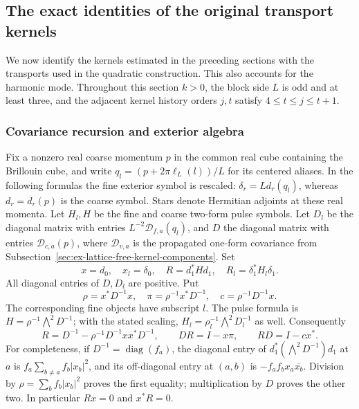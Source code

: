 \subsection{The exact identities of the original transport kernels}
\label{sec:kernel-transport-identities}
We now identify the kernels estimated in the preceding sections with
the transports used in the quadratic construction. This also accounts
for the harmonic mode. Throughout this section $k>0$, the block side
$L$ is odd and at least three, and the adjacent kernel history orders $j,t$
satisfy $4\le t\le j\le t+1$.

\subsubsection{Covariance recursion and exterior algebra}
Fix a nonzero real coarse momentum $p$ in the common real cube
containing the Brillouin cube, and write $q_l=(p+2\pi\ell_L(l))/L$
for its centered aliases. In the following formulas the fine exterior
symbol is rescaled: $\delta_r=Ld_r(q_l)$, whereas $d_r=d_r(p)$
is the coarse symbol. Stars denote Hermitian adjoints at these real
momenta. Let $H_l,H$ be the fine and coarse two-form pulse symbols.
Let $D_l$ be the diagonal matrix with entries $L^{-2}\mathscr D_{f,a}(q_l)$,
and $D$ the diagonal matrix with entries $\mathscr D_{c,a}(p)$, where
$\mathscr D_{v,a}$ is the propagated one-form covariance from
Subsection~\ref{sec:ex-lattice-free-kernel-components}.
Set
\[
 x=d_0,\quad x_l=\delta_0,\quad
 R=d_1^*Hd_1,\quad R_l=\delta_1^*H_l\delta_1.
\]
All diagonal entries of $D,D_l$ are positive. Put
\[
 \rho=x^*D^{-1}x,\quad
 \pi=\rho^{-1}x^*D^{-1},\quad
 c=\rho^{-1}D^{-1}x.
\]
The corresponding fine objects have subscript $l$. The pulse formula
is $H=\rho^{-1}\bigwedge^2D^{-1}$; with the stated scaling,
$H_l=\rho_l^{-1}\bigwedge^2D_l^{-1}$ as well. Consequently
\begin{equation}\label{eq:transport-rotor}
 R=D^{-1}-\rho^{-1}D^{-1}xx^*D^{-1},\qquad
 DR=I-x\pi,\qquad RD=I-cx^*.
\end{equation}
For completeness, if $D^{-1}=\operatorname{diag}(f_a)$, the
diagonal entry of $d_1^*(\bigwedge^2D^{-1})d_1$ at $a$ is
$f_a\sum_{b\ne a}f_b|x_b|^2$, and its off-diagonal entry at
$(a,b)$ is $-f_af_bx_a\overline{x_b}$. Division by
$\rho=\sum_bf_b|x_b|^2$ proves the first equality; multiplication
by $D$ proves the other two. In particular $Rx=0$ and $x^*R=0$.

